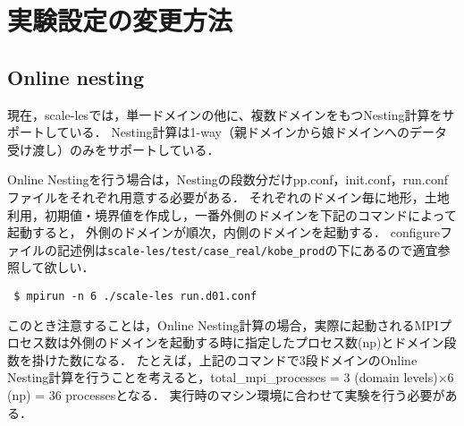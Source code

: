 \section{実験設定の変更方法}

\subsection{Online nesting}

現在，scale-lesでは，単一ドメインの他に、複数ドメインをもつNesting計算をサポートしている．
Nesting計算は1-way（親ドメインから娘ドメインへのデータ受け渡し）のみをサポートしている．

Online Nestingを行う場合は，Nestingの段数分だけpp.conf，init.conf，run.confファイルをそれぞれ用意する必要がある．
それぞれのドメイン毎に地形，土地利用，初期値・境界値を作成し，一番外側のドメインを下記のコマンドによって起動すると，
外側のドメインが順次，内側のドメインを起動する．
configureファイルの記述例は\verb|scale-les/test/case_real/kobe_prod|の下にあるので適宜参照して欲しい．
\begin{verbatim}
 $ mpirun -n 6 ./scale-les run.d01.conf
\end{verbatim}
このとき注意することは，Online Nesting計算の場合，実際に起動されるMPIプロセス数は外側のドメインを起動する時に指定したプロセス数(np)とドメイン段数を掛けた数になる．
たとえば，上記のコマンドで3段ドメインのOnline Nesting計算を行うことを考えると，total\_mpi\_processes = 3 (domain levels)×6 (np) = 36 processesとなる．
実行時のマシン環境に合わせて実験を行う必要がある．

